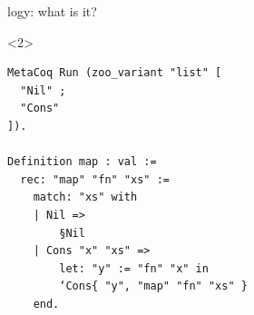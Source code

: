 \begin{frame}[fragile]{\Zoo[]logy: what is it?}
\begin{adjustwidth}{-1em}{-1em}

\begin{overbox}<2>
    \begin{verbatim}
MetaCoq Run (zoo_variant "list" [
  "Nil" ;
  "Cons"
]).

Definition map : val :=
  rec: "map" "fn" "xs" :=
    match: "xs" with
    | Nil =>
        §Nil
    | Cons "x" "xs" =>
        let: "y" := "fn" "x" in
        ‘Cons{ "y", "map" "fn" "xs" }
    end.
    \end{verbatim}
\end{overbox}


\end{adjustwidth}
\end{frame}
